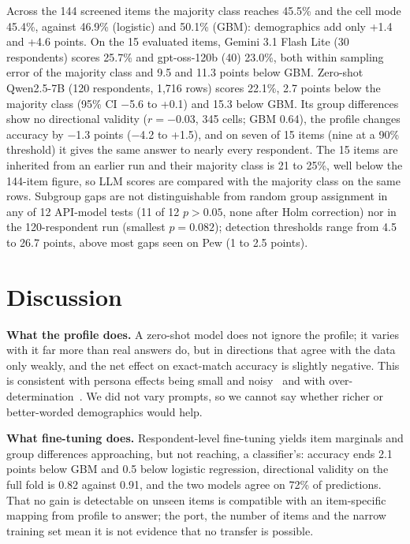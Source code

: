 \documentclass[conference]{IEEEtran}
\begin{document}
Across the 144 screened items the majority class reaches 45.5\% and the cell mode 45.4\%, against 46.9\% (logistic) and 50.1\% (GBM): demographics add only +1.4 and +4.6 points. On the 15 evaluated items, Gemini 3.1 Flash Lite (30 respondents) scores 25.7\% and gpt-oss-120b (40) 23.0\%, both within sampling error of the majority class and 9.5 and 11.3 points below GBM. Zero-shot Qwen2.5-7B (120 respondents, 1{,}716 rows) scores 22.1\%, 2.7 points below the majority class (95\% CI $-$5.6 to +0.1) and 15.3 below GBM. Its group differences show no directional validity ($r={-0.03}$, 345 cells; GBM 0.64), the profile changes accuracy by $-$1.3 points ($-$4.2 to +1.5), and on seven of 15 items (nine at a 90\% threshold) it gives the same answer to nearly every respondent. The 15 items are inherited from an earlier run and their majority class is 21 to 25\%, well below the 144-item figure, so LLM scores are compared with the majority class on the same rows. Subgroup gaps are not distinguishable from random group assignment in any of 12 API-model tests (11 of 12 $p>0.05$, none after Holm correction) nor in the 120-respondent run (smallest $p=0.082$); detection thresholds range from 4.5 to 26.7 points, above most gaps seen on Pew (1 to 2.5 points).

\section{Discussion}

\textbf{What the profile does.} A zero-shot model does not ignore the profile; it varies with it far more than real answers do, but in directions that agree with the data only weakly, and the net effect on exact-match accuracy is slightly negative. This is consistent with persona effects being small and noisy~\cite{hu2024} and with over-determination~\cite{chen2026}. We did not vary prompts, so we cannot say whether richer or better-worded demographics would help.

\textbf{What fine-tuning does.} Respondent-level fine-tuning yields item marginals and group differences approaching, but not reaching, a classifier's: accuracy ends 2.1 points below GBM and 0.5 below logistic regression, directional validity on the full fold is 0.82 against 0.91, and the two models agree on 72\% of predictions. That no gain is detectable on unseen items is compatible with an item-specific mapping from profile to answer; the port, the number of items and the narrow training set mean it is not evidence that no transfer is possible.
\end{document}
